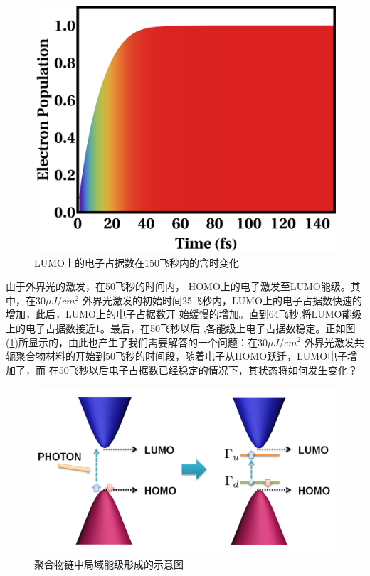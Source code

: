 \documentclass[12pt,]{report}
\begin{document}
\begin{figure}[h!] 
    \centering
    \includegraphics[scale=1]{./figures/Exciton_Figure_5.png}
    \caption{LUMO上的电子占据数在150飞秒内的含时变化}
    \label{fig:pop}
\end{figure}

由于外界光的激发，在50飞秒的时间内，
HOMO上的电子激发至LUMO能级。其中，在\(30\mu J/cm^2\)
外界光激发的初始时间25飞秒内，LUMO上的电子占据数快速的增加，此后，LUMO上的电子占据数开
始缓慢的增加。直到64飞秒,将LUMO能级上的电子占据数接近1。最后，在50飞秒以后
,各能级上电子占据数稳定。正如图
(\ref{fig:pop})所显示的，由此也产生了我们需要解答的一个问题：在\(30\mu J/cm^2\)
外界光激发共轭聚合物材料的开始到50飞秒的时间段，随着电子从HOMO跃迁，LUMO电子增加了，而
在50飞秒以后电子占据数已经稳定的情况下，其状态将如何发生变化？

\begin{figure}[h!] 
    \centering
    \includegraphics[scale=1]{./figures/Exciton_Figure_4.png}
    \caption{聚合物链中局域能级形成的示意图}
    \label{fig:energy}
\end{figure}
\end{document}
